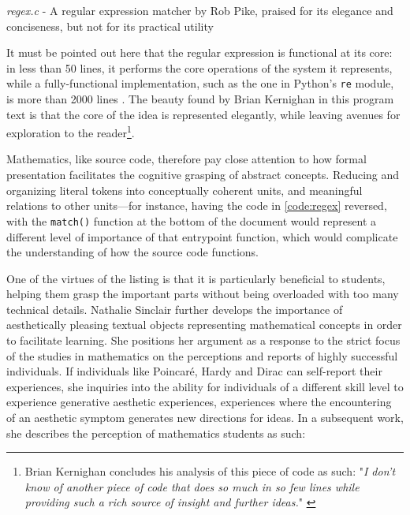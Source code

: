 \begin{listing}
    \inputminted{c}{./corpus/regex.c}
    \caption{\emph{regex.c} - A regular expression matcher by Rob Pike, praised for its elegance and conciseness, but not for its practical utility \citep{oram_beautiful_2007}}
    \label{code:regex}
\end{listing}

It must be pointed out here that the regular expression is functional at its core: in less than 50 lines, it performs the core operations of the system it represents, while a fully-functional implementation, such as the one in Python's \lstinline{re} module, is more than 2000 lines \citep{secretlabsab_parser_2001}. The beauty found by Brian Kernighan in this program text is that the core of the idea is represented elegantly, while leaving avenues for exploration to the reader\footnote{Brian Kernighan concludes his analysis of this piece of code as such: "\emph{I don’t know of another piece of code that does so much in so few lines while providing such a rich source of insight and further ideas.}" \citep{kernighan_regular_2007}}.

Mathematics, like source code, therefore pay close attention to how formal presentation facilitates the cognitive grasping of abstract concepts. Reducing and organizing literal tokens into conceptually coherent units, and meaningful relations to other units—for instance, having the code in \autoref{code:regex} reversed, with the \lstinline{match()} function at the bottom of the document would represent a different level of importance of that entrypoint function, which would complicate the understanding of how the source code functions.

One of the virtues of the listing is that it is particularly beneficial to students, helping them grasp the important parts without being overloaded with too many technical details. Nathalie Sinclair further develops the importance of aesthetically pleasing textual objects representing mathematical concepts in order to facilitate learning. She positions her argument as a response to the strict focus of the studies in mathematics on the perceptions and reports of highly successful individuals. If individuals like Poincaré, Hardy and Dirac can self-report their experiences, she inquiries into the ability for individuals of a different skill level to experience generative aesthetic experiences, experiences where the encountering of an aesthetic symptom generates new directions for ideas. In a subsequent work, she describes the perception of mathematics students as such:

